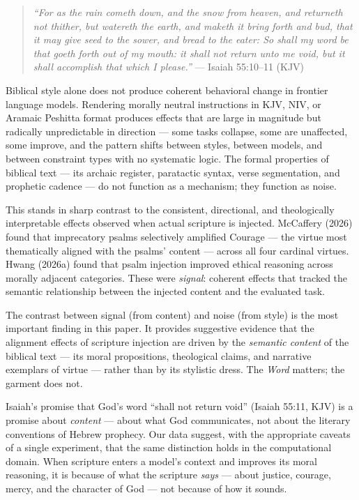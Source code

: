 \documentclass[10pt, letterpaper, twocolumn]{article}
\begin{document}
\begin{quote}
\emph{``For as the rain cometh down, and the snow from heaven, and returneth not thither, but watereth the earth, and maketh it bring forth and bud, that it may give seed to the sower, and bread to the eater: So shall my word be that goeth forth out of my mouth: it shall not return unto me void, but it shall accomplish that which I please.''} --- Isaiah 55:10--11 (KJV)
\end{quote}

Biblical style alone does not produce coherent behavioral change in frontier language models. Rendering morally neutral instructions in KJV, NIV, or Aramaic Peshitta format produces effects that are large in magnitude but radically unpredictable in direction --- some tasks collapse, some are unaffected, some improve, and the pattern shifts between styles, between models, and between constraint types with no systematic logic. The formal properties of biblical text --- its archaic register, paratactic syntax, verse segmentation, and prophetic cadence --- do not function as a mechanism; they function as noise.

This stands in sharp contrast to the consistent, directional, and theologically interpretable effects observed when actual scripture is injected. McCaffery (2026) found that imprecatory psalms selectively amplified Courage --- the virtue most thematically aligned with the psalms' content --- across all four cardinal virtues. Hwang (2026a) found that psalm injection improved ethical reasoning across morally adjacent categories. These were \emph{signal}: coherent effects that tracked the semantic relationship between the injected content and the evaluated task.

The contrast between signal (from content) and noise (from style) is the most important finding in this paper. It provides suggestive evidence that the alignment effects of scripture injection are driven by the \emph{semantic content} of the biblical text --- its moral propositions, theological claims, and narrative exemplars of virtue --- rather than by its stylistic dress. The \emph{Word} matters; the garment does not.

Isaiah's promise that God's word ``shall not return void'' (Isaiah 55:11, KJV) is a promise about \emph{content} --- about what God communicates, not about the literary conventions of Hebrew prophecy. Our data suggest, with the appropriate caveats of a single experiment, that the same distinction holds in the computational domain. When scripture enters a model's context and improves its moral reasoning, it is because of what the scripture \emph{says} --- about justice, courage, mercy, and the character of God --- not because of how it sounds.
\end{document}
